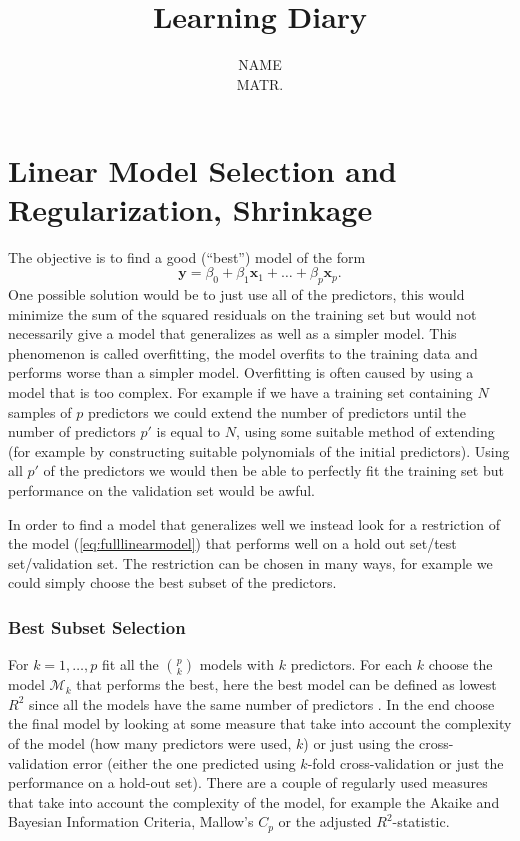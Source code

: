 \documentclass[a4paper, 12pt]{scrartcl}
\title{\vspace{0.7cm}{\Large \textbf{TILM3592\\Advanced Statistical Learning}}\\{\LARGE \bfseries Learning Diary}}
\author{{\large NAME}\\
{ MATR.}}
\date{}
\begin{document}
\maketitle


\section{Linear Model Selection and Regularization, Shrinkage}

The objective is to find a good (``best'') model of the form
\begin{equation}\label{eq:fulllinearmodel}
	\mathbf{y}=\beta_0+\beta_1\mathbf{x}_1+\ldots+\beta_p\mathbf{x}_p.
\end{equation}
One possible solution would be to just use all of the predictors, this would minimize the sum of the squared residuals on the training set but would not necessarily give a model that generalizes as well as a simpler model.
This phenomenon is called overfitting, the model overfits to the training data and performs worse than a simpler model.
Overfitting is often caused by using a model that is too complex.
For example if we have a training set containing $N$ samples of $p$ predictors we could extend the number of predictors until the number of predictors $p'$ is equal to $N$, using some suitable method of extending (for example by constructing suitable polynomials of the initial predictors).
Using all $p'$ of the predictors we would then be able to perfectly fit the training set but performance on the validation set would be awful.

In order to find a model that generalizes well we instead look for a restriction of the model (\ref{eq:fulllinearmodel}) that performs well on a hold out set/test set/validation set.
The restriction can be chosen in many ways, for example we could simply choose the best subset of the predictors.

\subsubsection*{Best Subset Selection}
\begin{algorithm}
For $k=1,\ldots,p$ fit all the ${p \choose k}$ models with $k$ predictors.
For each $k$ choose the model $\mathcal{M}_k$ that performs the best, here the best model can be defined as lowest $R^2$ since all the models have the same number of predictors .
In the end choose the final model by looking at some measure that take into account the complexity of the model (how many predictors were used, $k$) or just using the cross-validation error (either the one predicted using $k$-fold cross-validation or just the performance on a hold-out set).
There are a couple of regularly used measures that take into account the complexity of the model, for example the Akaike and Bayesian Information Criteria, Mallow's $C_p$ or the adjusted $R^2$-statistic.
\end{algorithm}
\end{document}
